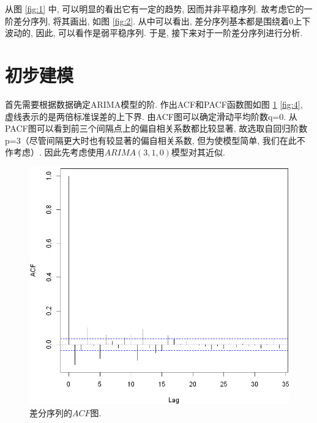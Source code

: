 \documentclass[11pt]{article}
\begin{document}
从图 \ref{fig:1} 中, 可以明显的看出它有一定的趋势, 因而并非平稳序列. 故考虑它的一阶差分序列, 将其画出, 如图 \ref{fig:2}. 从中可以看出, 差分序列基本都是围绕着0上下波动的, 因此, 可以看作是弱平稳序列. 于是, 接下来对于一阶差分序列进行分析. 
\section{初步建模}
\qquad 首先需要根据数据确定ARIMA模型的阶. 作出ACF和PACF函数图如图 \ref{fig:3} \ref{fig:4}, 虚线表示的是两倍标准误差的上下界. 由ACF图可以确定滑动平均阶数q=0. 从PACF图可以看到前三个间隔点上的偏自相关系数都比较显著, 故选取自回归阶数p=3（尽管间隔更大时也有较显著的偏自相关系数, 但为使模型简单, 我们在此不作考虑）. 因此先考虑使用$ARIMA(3,1,0)$模型对其近似. 

\begin{center}
    \hspace{30pt}\begin{minipage}{0.45\textwidth}
        \begin{figure}
            \centering
            \hspace{-30pt}\includegraphics[width=.9\textwidth]{output_8_0}
            \caption{差分序列的$ACF$图.\label{fig:3}}
        \end{figure}
    \end{minipage}
    \begin{minipage}{0.45\textwidth}
        \begin{figure}
            \centering

\end{figure}
\end{minipage}
\end{center}
\end{document}
